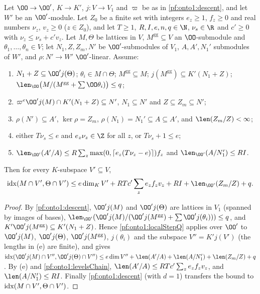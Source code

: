 \begin{proposition}\label{pf:onto1:levelsQDesc}
Let $\OO\to\OO'$, $K\to K'$, $j\colon V\to V_1$ and $\varpi$ be as in \cref{pf:onto1:descent}, and let $W'$ be an
$\OO'$-module. Let $Z_0$ be a finite set with integers $e_z\ge1$, $f_z\ge0$ and real numbers $\nu_z$, $v_z\ge0$
($z\in Z_0$), and let $T\ge1$, $R,I,e,n,q\in\N$, $\nu_s\in\R$ and $c'\ge0$ with $\nu_z\le\nu_s+c'v_z$. Let $M,\Theta$
be lattices in $V$, $M^{\mathrm{gg}}\subseteq V$ an $\OO$-submodule and $\theta_1,\dots,\theta_n\in V$; let
$N_1,Z,Z_m,N'$ be $\OO'$-submodules of $V_1$, $A,A',N_1'$ submodules of $W'$, and $\rho\colon N'\to W'$
$\OO'$-linear. Assume:
\begin{enumerate}[label=(\alph*)]
\item $N_1+Z\subseteq\OO'j(\Theta)$; $\theta_i\in M\cap\Theta$; $M^{\mathrm{gg}}\subseteq M$;
$j(M^{\mathrm{gg}})\subseteq K'(N_1+Z)$; $\len_{\OO}\bigl(M/(M^{\mathrm{gg}}+\sum\OO\theta_i)\bigr)\le q$;
\item $\varpi^e\OO'j(M)\cap K'(N_1+Z)\subseteq N'$, $N_1\subseteq N'$ and $Z\subseteq Z_m\subseteq N'$;
\item $\rho(N')\subseteq A'$, $\ker\rho=Z_m$, $\rho(N_1)=N_1'\subseteq A\subseteq A'$, and $\len(Z_m/Z)<\infty$;
\item either $T\nu_s\le e$ and $e_z\nu_z\in\Z$ for all $z$, or $T\nu_s+1\le e$;
\item $\len_{\OO'}(A'/A)\le R\sum_z\max(0,\lceil e_z(T\nu_z-e)\rceil)f_z$ and $\len_{\OO'}(A/N_1')\le RI$.
\end{enumerate}
Then for every $K$-subspace $V'\subseteq V$,
\[
\ontooneidx(M\cap V',\Theta\cap V')\le e\dim_KV'+RTc'\sum_{z}e_zf_zv_z+RI+\len_{\OO'}(Z_m/Z)+q.
\]
\end{proposition}

\begin{proof}
By \cref{pf:onto1:descent}, $\OO'j(M)$ and $\OO'j(\Theta)$ are lattices in $V_1$ (spanned by images of bases),
$\len_{\OO'}(\OO'j(M)/(\OO'j(M^{\mathrm{gg}})+\sum\OO'j(\theta_i)))\le q$, and $K'\OO'j(M^{\mathrm{gg}})\subseteq
K'(N_1+Z)$. Hence \cref{pf:onto1:localStepQ} applies over $\OO'$ to $\OO'j(M)$, $\OO'j(\Theta)$, $\OO'j(M^{\mathrm{gg}})$,
$j(\theta_i)$ and the subspace $V''=K'j(V')$ (the lengths in (e) are finite), and gives
$\ontooneidx(\OO'j(M)\cap V'',\OO'j(\Theta)\cap V'')\le e\dim V''+\len(A'/A)+\len(A/N_1')+\len(Z_m/Z)+q$. By (e)
and \cref{pf:onto1:levelsChain}, $\len(A'/A)\le RTc'\sum_ze_zf_zv_z$, and $\len(A/N_1')\le RI$. Finally
\cref{pf:onto1:descent} (with $d=1$) transfers the bound to $\operatorname{idx}(M\cap V',\Theta\cap V')$.
\end{proof}

